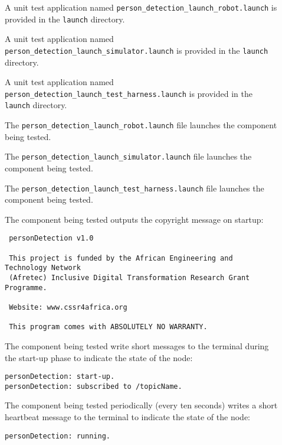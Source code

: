 \documentclass{CSSRforAfrica}
\newcommand{\checkboxChecked}{\fbox{\ding{51}}} %
\newcommand{\checkboxDashed}{\fbox{--}}         %
\begin{document}
\begin{description}

\item[\checkboxDashed] A unit test application named {\small \verb+person_detection_launch_robot.launch+} is provided in the {\small \verb+launch+} directory.

\item[\checkboxDashed] A unit test application named {\small \verb+person_detection_launch_simulator.launch+} is provided in the {\small \verb+launch+} directory.

\item[\checkboxDashed] A unit test application named {\small \verb+person_detection_launch_test_harness.launch+} is provided in the {\small \verb+launch+} directory.

\item[\checkboxDashed] The {\small \verb+person_detection_launch_robot.launch+} file launches the component being tested.

\item[\checkboxDashed] The {\small \verb+person_detection_launch_simulator.launch+} file launches the component being tested.

\item[\checkboxDashed] The {\small \verb+person_detection_launch_test_harness.launch+} file launches the component being tested.

\item[\checkboxChecked] The component being tested outputs the copyright message on startup:
{\small 
\begin{verbatim}
 personDetection v1.0
 
 This project is funded by the African Engineering and Technology Network 
 (Afretec) Inclusive Digital Transformation Research Grant Programme.
 
 Website: www.cssr4africa.org
 
 This program comes with ABSOLUTELY NO WARRANTY.
\end{verbatim}}

\item[\checkboxChecked]  The component being tested write short messages to the terminal during the start-up phase to indicate the state of the node:
{\small 
\begin{verbatim}
personDetection: start-up.
personDetection: subscribed to /topicName.
\end{verbatim}}

\item[\checkboxChecked]   The component being tested periodically (every ten seconds) writes a short heartbeat message to the terminal to indicate the state of the node:
{\small 
\begin{verbatim}
personDetection: running.
\end{verbatim}}


\end{description}
\end{document}
